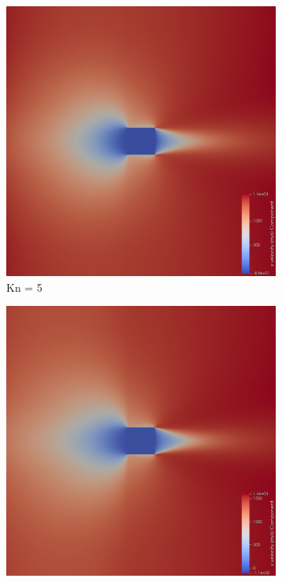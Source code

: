 \begin{figure}
    \centering
    \begin{subfigure}{0.32\textwidth}
        \centering
        \includegraphics[width=\textwidth]{Images/4. Results/Square Kn/pv/Kn5.png}
        \caption{Kn = 5}
    \end{subfigure}
    \hfill
    \begin{subfigure}{0.32\textwidth}
        \centering
        \includegraphics[width=\textwidth]{Images/4. Results/Square Kn/pv/Kn10.png}

\end{subfigure}
\end{figure}
